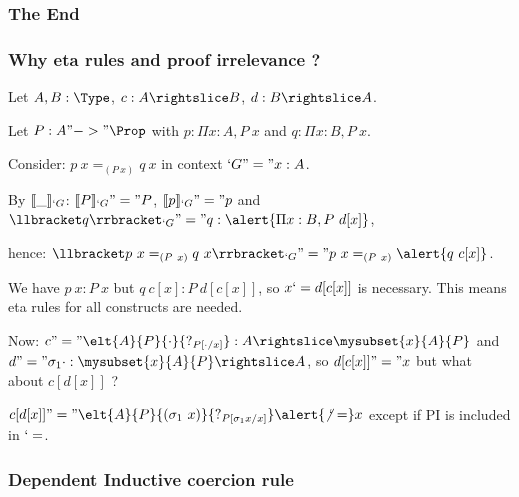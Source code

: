 \begin{frame}
  \frametitle{The End}
\end{frame}

\begin{frame}
  \frametitle{Why eta rules and proof irrelevance ?}
  
  Let $A,B : \Type$, $c : A \suba B$, $d : B \suba A$. 
  \pause
  
  Let $P : A "->" \Prop$ with $p : \Pi x : A, P~x$ and $q : \Pi x : B,
  P~x$.
  
  \pause
  Consider: $p~x =_{(P~x)} q~x$ in context $`G "=" x : A$. 
  
  By $\llbracket \_ \rrbracket_{`G}$: $\llbracket P \rrbracket_{`G} "=" P$, $\llbracket p \rrbracket_{`G} "=" p$ and
  $\ip{q}{`G} "=" q : \alert{\Pi x : B, P~d[x]}$, \pause 
  
  hence: $\ip{p~x =_{(P~x)} q~x}{`G} "=" p~x =_{(P~x)} \alert{q~c[x]}$.

  We have $p~x : P~x$ but $q~c[x] : P~d[c[x]]$, so $x `= d[c[x]]$ is
  necessary.
  This means eta rules for all constructs are needed.
  \pause
  
  Now: $c "=" \elt{A}{P}{\cdot}{?_{P[\cdot/x]}} : A \suba
  \mysubset{x}{A}{P}$ and $d "=" \eltpit{\cdot} : \mysubset{x}{A}{P}
  \suba A$, so $d[c[x]] "=" x$ but what about $c[d[x]]$ ? 
  \pause

  $c[d[x]] "=" \elt{A}{P}{(\eltpit~x)}{?_{P[\eltpit x/x]}} \alert{\not`=}
  x$ except if PI is included in $`=$.
  
\end{frame}



\begin{frame}
  \frametitle{Dependent Inductive coercion rule}
  \indfig
\end{frame}



